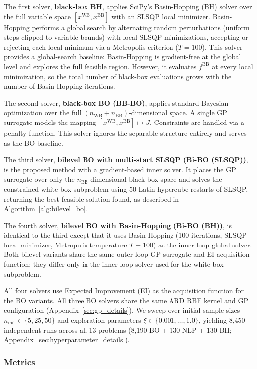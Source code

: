 \documentclass[12pt,a4paper]{article}%
\theoremstyle{plain}%
\theoremstyle{remark}%
\theoremstyle{definition}%
\def\WB{\mathrm{WB}}
\def\BB{\mathrm{BB}}
\begin{document}
The first solver, \textbf{black-box BH}, applies SciPy's Basin-Hopping (BH) solver over the full variable space $[x^{\WB}, x^{\BB}]$ with an SLSQP local minimizer. Basin-Hopping performs a global search by alternating random perturbations (uniform steps clipped to variable bounds) with local SLSQP minimizations, accepting or rejecting each local minimum via a Metropolis criterion ($T=100$). This solver provides a global-search baseline: Basin-Hopping is gradient-free at the global level and explores the full feasible region. However, it evaluates $f^{\BB}$ at every local minimization, so the total number of black-box evaluations grows with the number of Basin-Hopping iterations.

The second solver, \textbf{black-box BO (BB-BO)}, applies standard Bayesian optimization over the full $(n_{\WB}+n_{\BB})$-dimensional space. A single GP surrogate models the mapping $[x^{\WB}, x^{\BB}] \mapsto J$. Constraints are handled via a penalty function. This solver ignores the separable structure entirely and serves as the BO baseline.

The third solver, \textbf{bilevel BO with multi-start SLSQP (Bi-BO (SLSQP))}, is the proposed method with a gradient-based inner solver. It places the GP surrogate over only the $n_{\BB}$-dimensional black-box space and solves the constrained white-box subproblem using 50 Latin hypercube restarts of SLSQP, returning the best feasible solution found, as described in Algorithm~\ref{alg:bilevel_bo}.

The fourth solver, \textbf{bilevel BO with Basin-Hopping (Bi-BO (BH))}, is identical to the third except that it uses Basin-Hopping (100 iterations, SLSQP local minimizer, Metropolis temperature $T=100$) as the inner-loop global solver. Both bilevel variants share the same outer-loop GP surrogate and EI acquisition function; they differ only in the inner-loop solver used for the white-box subproblem.

All four solvers use Expected Improvement (EI) as the acquisition function for the BO variants. All three BO solvers share the same ARD RBF kernel and GP configuration (Appendix~\ref{sec:gp_details}). We sweep over initial sample sizes $n_\text{init} \in \{5, 25, 50\}$ and exploration parameters $\xi \in \{0.001, \ldots, 1.0\}$, yielding 8{,}450 independent runs across all 13 problems (8{,}190 BO + 130 NLP + 130 BH; Appendix~\ref{sec:hyperparameter_details}).

\subsubsection{Metrics}\label{subsec:metrics}
\end{document}
